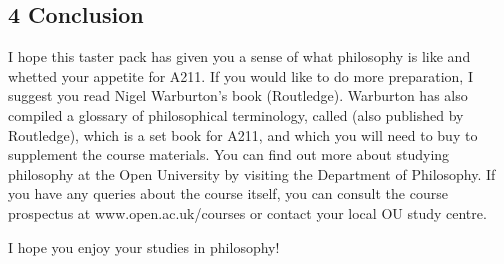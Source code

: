 \documentclass[letterpaper,10pt,english]{sphinxmanual}
\begin{document}
\subsection{4 Conclusion}
\label{\detokenize{content/session_00/Part_00_04:4-Conclusion}}\label{\detokenize{content/session_00/Part_00_04::doc}}
I hope this taster pack has given you a sense of what philosophy is like and whetted your appetite for A211. If you would like to do more preparation, I suggest you read Nigel Warburton’s book  (Routledge). Warburton has also compiled a glossary of philosophical terminology, called  (also published by Routledge), which is a set book for A211, and which you will need to buy to supplement the course materials. You can find out more about studying
philosophy at the Open University by visiting the Department of Philosophy. If you have any queries about the course itself, you can consult the course prospectus at www.open.ac.uk/courses or contact your local OU study centre.

I hope you enjoy your studies in philosophy!



\renewcommand{\indexname}{Index}
\printindex
\end{document}
